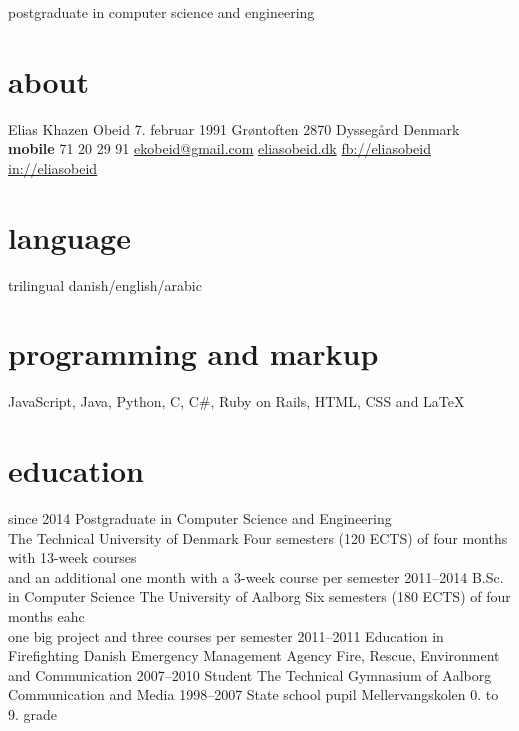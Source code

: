 \documentclass[]{friggeri-cv}
\begin{document}
    {postgraduate in computer science and engineering}

\begin{aside}
  \section{about}
    Elias Khazen Obeid
    7. februar 1991
    Grøntoften 
    2870 Dyssegård
    Denmark
    ~
    \textbf{mobile} 71 20 29 91
    \href{mailto:ekobeid@gmail.com}{ekobeid@gmail.com}
    \href{http://eliasobeid.dk}{eliasobeid.dk}
    \href{http://facebook.com/eliaskhazenobeid}{fb://eliasobeid}
    \href{http://www.linkedin.com/in/eliasobeid}{in://eliasobeid}
  \section{language}
    trilingual danish/english/arabic
  \section{programming and markup}
    JavaScript, Java,
    Python, C, C\#,
    Ruby on Rails,
    HTML, CSS and \LaTeX{}
\end{aside}


\section{education}

\begin{entrylist}
  \entry
    {since 2014}
    {Postgraduate {\normalfont in Computer Science and Engineering}\\}
    {The Technical University of Denmark}
    {Four semesters (120 ECTS) of four months with 13-week courses\\
    and an additional one month with a 3-week course per semester}
  \entry
    {2011–2014}
    {B.Sc. {\normalfont in Computer Science}}
    {The University of Aalborg}
    {Six semesters (180 ECTS) of four months eahc\\
    one big project and three courses per semester}
  \entry
    {2011–2011}
    {Education in Firefighting}
    {Danish Emergency Management Agency}
    {Fire, Rescue, Environment and Communication}
  \entry
    {2007–2010}
    {Student}
    {The Technical Gymnasium of Aalborg}
    {Communication and Media}
  \entry
    {1998–2007}
    {State school pupil}
    {Mellervangskolen}
    {0. to 9. grade}
\end{entrylist}
\end{document}
